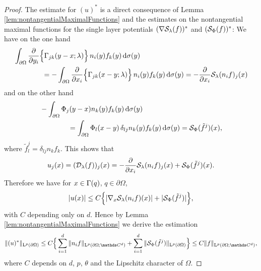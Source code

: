 \begin{proof}
  The estimate for $(u)^*$ is a direct consequence of Lemma \ref{lem:nontangentialMaximalFunctions} and the estimates on the nontangential maximal functions for the single layer potentials $(\nabla \mathcal{S}_\lambda(f))^*$ and $(\mathcal{S}_\Phi(f))^*$:
  We have on the one hand
  \begin{align}
    \label{eq:rep1}
    \begin{alignedat}{1}
    &\int_{\partial\Omega} \frac{\partial}{\partial y_i} \Big\{ \Gamma_{jk}(y - x; \lambda) \Big\} \, n_i(y) f_k(y) \, {\operatorname{d}\!{\sigma}}(y) \\
    &\qquad\qquad= -\int_{\partial\Omega} \frac{\partial}{\partial x_i} \Big\{ \Gamma_{jk}(x - y; \lambda) \Big\}\, n_i(y) f_k(y) \, {\operatorname{d}\!{\sigma}}(y)
    = -\frac{\partial}{\partial x_i} \mathcal{S}_\lambda(n_i f)_j(x)
    \end{alignedat}
  \end{align}
  and on the other hand
  \begin{align}
    \label{eq:rep2}
    \begin{alignedat}{1}
    &-\int_{\partial\Omega} \Phi_j(y - x) n_k(y) f_k(y) \, {\operatorname{d}\!{\sigma}}(y) \\
    &\qquad\qquad= \int_{\partial\Omega} \Phi_l(x - y)\, \delta_{lj} n_k(y) f_k(y) \, {\operatorname{d}\!{\sigma}}(y)
    = \mathcal{S}_\Phi(\tilde f^j)(x), 
    \end{alignedat}
  \end{align}
  where $\tilde f^j_l = \delta_{lj} n_k f_k$.
  This shows that
  \begin{align*}
    u_j(x) = (\mathcal{D}_\lambda(f))_j(x) = -\frac{\partial}{\partial x_i} \mathcal{S}_\lambda(n_i f)_j(x) + \mathcal{S}_\Phi(\tilde f^j)(x).
  \end{align*}
  Therefore we have for $x \in \Gamma(q)$, $q \in \partial\Omega$,
  \begin{align*}
    |u(x)| \leq C \Big\{ |\nabla_x \mathcal{S}_\lambda(n_i f)(x)| + |\mathcal{S}_\Phi(\tilde f^j) | \Big\}, 
  \end{align*}
  with $C$ depending only on $d$.
  Hence by Lemma \ref{lem:nontangentialMaximalFunctions} we derive the estimation
  \begin{align*}
    \| (u)^* \|_{\Ell^p(\partial\Omega)} 
    \leq C \Big\{ \sum_{i = 1}^d \| n_i f \|_{\Ell^p(\partial\Omega; \C^d)} + \sum_{i = 1}^d \| \slp_\Phi(\tilde f^j) \|_{\Ell^p(\partial\Omega)}\Big\} 
    \leq C \|f\|_{\Ell^p(\partial\Omega; \C^d)},
  \end{align*}
  where $C$ depends on $d$, $p$, $\theta$ and the Lipschitz character of $\Omega$.


\end{proof}
